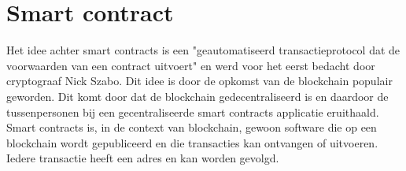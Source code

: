 \section{Smart contract}
Het idee achter smart contracts is een "geautomatiseerd transactieprotocol dat de voorwaarden van een contract uitvoert" \cite{smartContracts} en werd voor het eerst bedacht door cryptograaf Nick Szabo. Dit idee is door de opkomst van de blockchain populair geworden. Dit komt door dat de blockchain gedecentraliseerd is en daardoor de tussenpersonen bij een gecentraliseerde smart contracts applicatie eruithaald. Smart contracts is, in de context van blockchain, gewoon software die op een blockchain wordt gepubliceerd en die transacties kan ontvangen of uitvoeren. Iedere transactie heeft een adres en kan worden gevolgd. \par